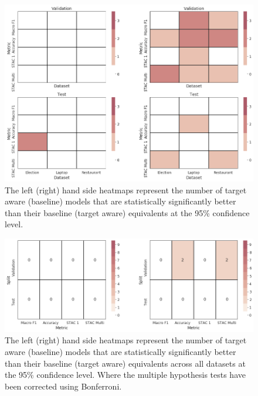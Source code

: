 \begin{figure}[!h]
    \centering
    \includegraphics[scale=0.35]{images/augmentation/methods_performance/Inter_Target/dataset_sig_scores_inter_target.png}
    \caption{The left (right) hand side heatmaps represent the number of target aware (baseline) models that are statistically significantly better than their baseline (target aware) equivalents at the 95\% confidence level.}
    \label{fig:aug_dataset_sig_scores_inter_target}
\end{figure}
\begin{figure}[!h]
    \centering
    \includegraphics[scale=0.35]{images/augmentation/methods_performance/Inter_Target/combined_sig_scores_inter_target.png}
    \caption{The left (right) hand side heatmaps represent the number of target aware (baseline) models that are statistically significantly better than their baseline (target aware) equivalents across all datasets at the 95\% confidence level. Where the multiple hypothesis tests have been corrected using Bonferroni.}
    \label{fig:aug_combined_sig_scores_inter_target}
\end{figure}

